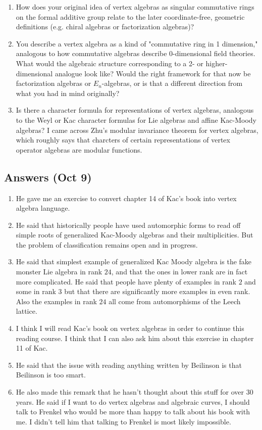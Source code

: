 \documentclass[12pt]{article}
\begin{document}
\begin{enumerate}
    \item How does your original idea of vertex algebras as singular commutative rings on the formal additive group relate to the later coordinate-free, geometric definitions (e.g. chiral algebras or factorization algebras)?


\item You describe a vertex algebra as a kind of "commutative ring in 1 dimension," analogous to how commutative algebras describe 0-dimensional field theories. What would the algebraic structure corresponding to a 2- or higher-dimensional analogue look like? Would the right framework for that now be factorization algebras or $E_n$-algebras, or is that a different direction from what you had in mind originally?


\item Is there a character formula for representations of vertex algebras, analogous to the Weyl or Kac character formulas for Lie algebras and affine Kac-Moody algebras? I came across Zhu's modular invariance theorem for vertex algebras, which roughly says that charcters of certain representations of vertex operator algebras are modular functions. 
\end{enumerate}

\subsection*{Answers (Oct 9)}
\begin{enumerate}
    \item He gave me an exercise to convert chapter 14 of Kac's book into vertex algebra language.
    \item He said that historically people have used automorphic forms to read off simple roots of generalized Kac-Moody algebras and their multiplicities. But the problem of classification remains open and in progress.
    \item He said that simplest example of generalized Kac Moody algebra is the fake monster Lie algebra in rank $24$, and that the ones in lower rank are in fact more complicated. He said that people have plenty of examples in rank $2$ and some in rank $3$ but that there are significantly more examples in even rank. Also the examples in rank $24$ all come from automorphisms of the Leech lattice.
    \item I think I will read Kac's book on vertex algebras in order to continue this reading course. I think that I can also ask him about this exercise in chapter 11 of Kac.
    \item He said that the issue with reading anything written by Beilinson is that Beilinson is too smart.
    \item He also made this remark that he hasn't thought about this stuff for over 30 years. He said if I want to do vertex algebras and algebraic curves, I should talk to Frenkel who would be more than happy to talk about his book with me. I didn't tell him that talking to Frenkel is most likely impossible.
\end{enumerate}
\end{document}

